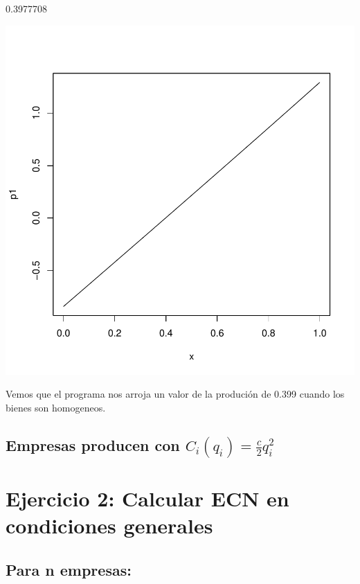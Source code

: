 \documentclass{article}
\begin{document}
\begin{Schunk}
\begin{Soutput}
[1] 0.3977708
\end{Soutput}
\end{Schunk}
\includegraphics{PUTAPRUEBA-002}



Vemos que el programa nos arroja un valor de la produción de 0.399 cuando los bienes son homogeneos.

\subsection{Empresas producen con $C_i(q_i)=\frac{c}{2}q_i^2$}

\section{Ejercicio 2: Calcular ECN en condiciones generales}                     
\subsection{Para n empresas:}
\end{document}
